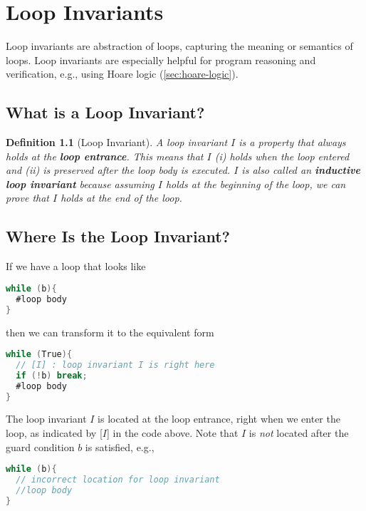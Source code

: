\documentclass[oneside,11pt,dvipsnames]{book}
\newtheorem{definition}{Definition}[section]
\begin{document}

    

\chapter{Loop Invariants}\label{chap:loop-invariants}

Loop invariants are abstraction of loops, capturing the meaning or semantics of loops. Loop invariants are especially helpful for program reasoning and verification, e.g., using Hoare logic (\autoref{sec:hoare-logic}).


\section{What is a Loop Invariant?}\label{what-is-a-loop-invariant}

\begin{definition}[Loop Invariant]
A loop invariant $I$ is a property that always holds at the
\textbf{loop entrance}. This means that $I$ (i) holds when the
loop entered and (ii) is preserved after the loop body is executed. $I$ is also called an \textbf{inductive loop invariant} because assuming $I$ holds at the beginning of the loop, we can prove that $I$ holds at the end of the loop.
\end{definition}
\section{Where Is the Loop Invariant?}\label{where-is-the-loop-invariant}

If we have a loop that looks like

\begin{lstlisting}[language=C]
while (b){
  #loop body
}
\end{lstlisting}

\noindent then we can transform it to the equivalent form
\begin{lstlisting}[language=C]
while (True){
  // [I] : loop invariant I is right here
  if (!b) break;
  #loop body
}
\end{lstlisting}

The loop invariant $I$ is located at the loop entrance, right when we enter the loop, as
indicated by [$I$] in the code above.
Note that $I$ is \emph{not} located after the guard
condition $b$ is satisfied, e.g.,
\begin{lstlisting}[language=C]
while (b){
  // incorrect location for loop invariant
  //loop body
}
\end{lstlisting}
\end{document}
